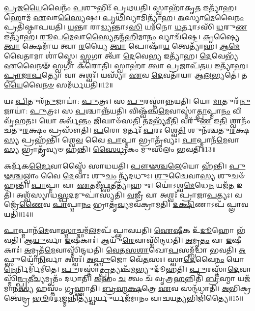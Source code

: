 \-\ul{𑌪𑍍𑌰}\-𑌜\-\ul{𑌯𑍈}\-𑌵𑍈𑌨𑌂᳴ \ul{𑌪}\-𑌶𑍁𑌭𑌿𑌃᳴ 𑌪𑍍𑌰𑌥𑌯𑌤𑌿।
𑌸𑍍𑌵𑌾𑌹𑌾᳴𑌕𑍃\-\ul{𑌤} 𑌇𑌤𑍍𑌯𑌾᳴𑌹।
𑌹𑍋𑌮᳴ \ul{𑌏}\-𑌵𑌾\-\ul{𑌸𑍍𑌯𑍈}\-𑌷𑌃।
\-\ul{𑌪𑍃}\-\-\ul{𑌥𑌿}\-𑌵𑍍𑌯𑌾𑌮𑌿𑌤𑍍𑌯𑌾᳴𑌹।
\-\ul{𑌅}\-𑌸𑍍𑌯𑌾\-\ul{𑌮𑍇}\-𑌵𑍈\-\ul{𑌨𑌂} 𑌪𑍍𑌰𑌤𑌿᳴\-𑌷𑍍𑌠𑌾𑌪𑌯𑌤𑌿।
\-\ul{𑌯}\-𑌨𑍍𑌤𑌾 𑌰𑌾\-\ul{𑌡𑍍𑌯}\-𑌨𑍍𑌤𑌾𑌽\-\ul{𑌸𑌿} 𑌯𑌮᳴𑌨𑍋 \ul{𑌧}\-𑌰𑍍𑌤𑌾𑌽𑌸𑌿᳴ \ul{𑌧}\-𑌰𑍁\-\ul{𑌣} 𑌇𑌤𑍍𑌯𑌾᳴𑌹।
\-\ul{𑌰𑍂}\-𑌪\-\ul{𑌮𑍇}\-𑌵𑌾\-\ul{𑌸𑍍𑌯𑍈}\-𑌤𑌨𑍍𑌮᳴\-\ul{𑌹𑌿}\-𑌮𑌾\-\ul{𑌨𑌂} 𑌵𑍍𑌯𑌾𑌚᳴𑌷𑍍𑌟𑍇।
\-\ul{𑌕𑍃}\-𑌷𑍍𑌯𑍈 \ul{𑌤𑍍𑌵𑌾} 𑌕𑍍𑌷𑍇𑌮𑌾᳴𑌯 𑌤𑍍𑌵𑌾 \ul{𑌰}\-𑌯𑍍𑌯𑍈 \ul{𑌤𑍍𑌵𑌾} 𑌪𑍋𑌷𑌾᳴\-\ul{𑌯} 𑌤𑍍𑌵𑍇𑌤𑍍𑌯𑌾᳴𑌹।
\-\ul{𑌆}\-\-\-\ul{𑌮𑍇}\-𑌵𑍈𑌤𑌾𑌮𑌾 𑌶𑌾॑𑌸𑍍𑌤𑍇।
\-\ul{𑌸𑍍𑌵}\-𑌗𑌾 𑌤𑍍𑌵𑌾᳴ \ul{𑌦𑍇}\-𑌵𑍇\-\ul{𑌭𑍍𑌯} 𑌇𑌤𑍍𑌯𑌾᳴𑌹।
\-\ul{𑌦𑍇}\-𑌵𑍇𑌭𑍍𑌯᳴ \ul{𑌏}\-𑌵𑍈𑌨𑍟᳴ \ul{𑌸𑍍𑌵}\-𑌗𑌾 𑌕᳴𑌰𑍋𑌤𑌿।
𑌸𑍍𑌵𑌾𑌹𑌾॑ 𑌤𑍍𑌵𑌾 \ul{𑌪𑍍𑌰}\-𑌜𑌾𑌪᳴𑌤\-\ul{𑌯} 𑌇𑌤𑍍𑌯𑌾᳴𑌹।
\-\ul{𑌪𑍍𑌰𑌾}\-\-\ul{𑌜𑌾}\-\-\ul{𑌪}\-𑌤𑍍𑌯𑍋 𑌵𑌾 𑌅𑌶𑍍𑌵𑌃᳴।
𑌯𑌸𑍍𑌯𑌾᳴ \ul{𑌏}\-𑌵 \ul{𑌦𑍇}\-𑌵𑌤𑌾᳴𑌯𑌾 𑌆\-\ul{𑌲}\-𑌭𑍍𑌯𑌤𑍇॑।
𑌤\-\ul{𑌯𑍈}\-𑌵𑍈\-\ul{𑌨}\-\-\ul{𑍞} 𑌸𑌮᳴𑌰𑍍𑌧𑌯𑌤𑌿॥12॥\anuvakamend[\-\ul{𑌬}\-\-\ul{𑌧𑍍𑌨𑌾}\-\-\ul{𑌤𑌿} 𑌸𑌮𑍃᳴𑌦𑍍𑌧𑍍𑌯𑌾 \ul{𑌉}\-𑌪𑌾𑌦᳴𑌧𑌾\-\ul{𑌤𑍍𑌯}\-𑌸𑍀𑌤𑍍𑌯𑌾᳴\-\ul{𑌹} 𑌸𑌪𑍍𑌰᳴𑌥\-\ul{𑌸}\-𑌮𑌿𑌤𑍍𑌯𑌾᳴𑌹 \ul{𑌦𑍇}\-𑌵𑍇\-\ul{𑌭𑍍𑌯} 𑌇𑌤𑍍𑌯𑌾᳴\-\ul{𑌹} 𑌪𑌞𑍍𑌚᳴ 𑌚]

𑌯𑌃 \ul{𑌪𑌿}\-𑌤𑍁𑌰᳴\-\ul{𑌨𑍁}\-𑌜𑌾𑌯𑌾॑: \ul{𑌪𑍁}\-𑌤𑍍𑌰𑌃।
𑌸 \ul{𑌪𑍁}\-𑌰𑌸𑍍𑌤𑌾॑𑌨𑍍𑌨𑌯𑌤𑌿।
𑌯𑍋 \ul{𑌮𑌾}\-𑌤𑍁𑌰᳴\-\ul{𑌨𑍁}\-𑌜𑌾𑌯𑌾॑: \ul{𑌪𑍁}\-𑌤𑍍𑌰𑌃।
𑌸 \ul{𑌪}\-𑌶𑍍𑌚𑌾𑌨𑍍𑌨᳴𑌯𑌤𑌿।
𑌵𑌿𑌷𑍍𑌵᳴𑌞𑍍𑌚\-\ul{𑌮𑍇}\-𑌵𑌾𑌸𑍍𑌮𑌾॑\-\ul{𑌤𑍍𑌪𑌾}\-𑌪𑍍𑌮𑌾\-\ul{𑌨𑌂} 𑌵𑌿𑌵𑍃᳴𑌹𑌤𑌃।
𑌯𑍋 𑌅𑌰𑍍𑌵᳴\-\ul{𑌨𑍍𑌤𑌂} 𑌜𑌿𑌘𑌾𑍞᳴𑌸\-\ul{𑌤𑌿} 𑌤\-\ul{𑌮}\-𑌭𑍍𑌯᳴𑌮𑍀\-\ul{𑌤𑌿} 𑌵𑌰𑍁᳴\-\ul{𑌣} 𑌇\-\ul{𑌤𑌿} 𑌶𑍍𑌵𑌾𑌨𑌂᳴ 𑌚𑌤𑍁\-\ul{𑌰}\-𑌕𑍍𑌷𑌂 𑌪𑍍𑌰𑌸𑍗᳴𑌤𑌿।
\-\ul{𑌪}\-𑌰𑍋 𑌮𑌰𑍍𑌤𑌃᳴ \ul{𑌪}\-𑌰𑌃 𑌶𑍍𑌵𑍇\-\ul{𑌤𑌿} 𑌶𑍁𑌨᳴𑌶𑍍𑌚𑌤𑍁\-\ul{𑌰}\-𑌕𑍍𑌷\-\ul{𑌸𑍍𑌯} 𑌪𑍍𑌰𑌹᳴𑌨𑍍𑌤𑌿।
𑌶𑍍𑌵𑍇\-\ul{𑌵} 𑌵𑍈 \ul{𑌪𑌾}\-𑌪𑍍𑌮𑌾 𑌭𑍍𑌰𑌾𑌤𑍃᳴𑌵𑍍𑌯𑌃।
\-\ul{𑌪𑌾}\-𑌪𑍍𑌮𑌾𑌨᳴\-\ul{𑌮𑍇}\-𑌵𑌾\-\ul{𑌸𑍍𑌯} 𑌭𑍍𑌰𑌾𑌤𑍃᳴𑌵𑍍𑌯𑍞 𑌹𑌨𑍍𑌤𑌿।
\-\ul{𑌸𑍈}\-\-\ul{𑌧𑍍𑌰}\-𑌕𑌂 𑌮𑍁𑌸᳴𑌲𑌂 𑌭𑌵𑌤𑌿॥13॥

𑌕𑌰𑍍𑌮᳴𑌕\-\ul{𑌰𑍍𑌮𑍈}\-𑌵𑌾𑌸𑍍𑌮𑍈᳴ 𑌸𑌾𑌧𑌯𑌤𑌿।
\-\ul{𑌪𑍗}\-\-\ul{𑍟}\-\-\ul{𑌶𑍍𑌚}\-\-\ul{𑌲𑍇}\-𑌯𑍋 𑌹᳴𑌨𑍍𑌤𑌿।
\-\ul{𑌪𑍁}\-\-\ul{𑍟}\-\-\ul{𑌶𑍍𑌚}\-𑌲𑍍𑌵𑌾𑌂 𑌵𑍈 \ul{𑌦𑍇}\-𑌵𑌾𑌃 𑌶𑍁\-\ul{𑌚𑌂} 𑌨𑍍𑌯᳴𑌦𑌧𑍁𑌃।
\-\ul{𑌶𑍁}\-𑌚𑍈𑌵𑌾\-\ul{𑌸𑍍𑌯} 𑌶𑍁𑌚𑍞᳴ 𑌹𑌨𑍍𑌤𑌿।
\-\ul{𑌪𑌾}\-𑌪𑍍𑌮𑌾 𑌵𑌾 \ul{𑌏}\-𑌤𑌮𑍀॑\-\ul{𑌫𑍍𑌸}\-𑌤𑍀𑌤𑍍𑌯𑌾᳴𑌹𑍁𑌃।
𑌯𑍋॑𑌽𑌶𑍍𑌵\-\ul{𑌮𑍇}\-𑌧𑍇\-\ul{𑌨} 𑌯𑌜᳴\-\ul{𑌤} 𑌇𑌤𑌿᳴।
𑌅𑌶𑍍𑌵᳴𑌸𑍍𑌯𑌾𑌧\-\ul{𑌸𑍍𑌪}\-𑌦𑌮𑍁\-𑌪𑌾॑𑌸𑍍𑌯𑌤𑌿।
\-\ul{𑌵}\-𑌜𑍍𑌰𑍀 𑌵𑌾 𑌅𑌶𑍍𑌵𑌃᳴ 𑌪𑍍𑌰𑌾𑌜𑌾\-\ul{𑌪}\-𑌤𑍍𑌯𑌃।
𑌵𑌜𑍍𑌰𑍇᳴\-\ul{𑌣𑍈}\-𑌵 \ul{𑌪𑌾}\-𑌪𑍍𑌮𑌾\-\ul{𑌨𑌂} 𑌭𑍍𑌰𑌾𑌤𑍃᳴\-\ul{𑌵𑍍𑌯}\-𑌮𑌵᳴\-𑌕𑍍𑌰𑌾𑌮𑌤𑌿।
\-\ul{𑌦}\-\-\ul{𑌕𑍍𑌷𑌿}\-𑌣𑌾𑌽𑌪᳴ 𑌪𑍍𑌲𑌾𑌵𑌯𑌤𑌿॥14॥

\-\ul{𑌪𑌾}\-𑌪𑍍𑌮𑌾𑌨᳴\-\ul{𑌮𑍇}\-𑌵𑌾\-\ul{𑌸𑍍𑌮𑌾}\-𑌚𑍍𑌛𑌮᳴\-\ul{𑌲}\-𑌮𑌪᳴ 𑌪𑍍𑌲𑌾𑌵𑌯𑌤𑌿।
\-\ul{𑌐}\-\-\ul{𑌷𑍀}\-𑌕 𑌉᳴\-\ul{𑌦𑍂}\-𑌹𑍋 𑌭᳴𑌵𑌤𑌿।
𑌆\-\ul{𑌯𑍁}\-𑌰𑍍𑌵𑌾 \ul{𑌇}\-𑌷𑍀𑌕𑌾𑌃॑।
𑌆𑌯𑍁᳴\-\ul{𑌰𑍇}\-𑌵𑌾𑌸𑍍𑌮𑌿᳴𑌨𑍍𑌦𑌧𑌤𑌿।
\-\ul{𑌅}\-𑌮𑍃\-\ul{𑌤𑌂} 𑌵𑌾 \ul{𑌇}\-𑌷𑍀𑌕𑌾𑌃॑।
\-\ul{𑌅}\-𑌮𑍃𑌤᳴\-\ul{𑌮𑍇}\-𑌵𑌾𑌸𑍍𑌮𑌿᳴𑌨𑍍𑌦𑌧𑌤𑌿।
\-\ul{𑌵𑍇}\-\-\ul{𑌤}\-\-\ul{𑌸}\-\-\ul{𑌶𑌾}\-𑌖𑍋\-\ul{𑌪}\-𑌸𑌮𑍍𑌬᳴𑌦𑍍𑌧𑌾 𑌭𑌵𑌤𑌿।
\-\ul{𑌅}\-𑌫𑍍𑌸𑍁𑌯𑍋᳴\-\ul{𑌨𑌿}\-𑌰𑍍𑌵𑌾 𑌅𑌶𑍍𑌵𑌃᳴।
\-\ul{𑌅}\-\-\ul{𑌫𑍍𑌸𑍁}\-𑌜𑍋 𑌵𑍇᳴\-\ul{𑌤}\-𑌸𑌃।
𑌸𑍍𑌵𑌾\-\ul{𑌦𑍇}\-𑌵𑍈\-\ul{𑌨𑌂} 𑌯𑍋\-\ul{𑌨𑍇}\-𑌰𑍍𑌨𑌿𑌰𑍍𑌮𑌿᳴𑌮𑍀𑌤𑍇।
\-\ul{𑌪𑍁}\-𑌰𑌸𑍍𑌤𑌾॑\-\ul{𑌤𑍍𑌪𑍍𑌰}\-𑌤𑍍𑌯𑌞𑍍𑌚᳴\-\ul{𑌮}\-𑌭𑍍𑌯𑍁𑌦𑍂᳴𑌹𑌤𑌿।
\-\ul{𑌪𑍁}\-𑌰𑌸𑍍𑌤𑌾᳴\-\ul{𑌦𑍇}\-𑌵𑌾𑌸𑍍𑌮𑌿᳴\-\ul{𑌨𑍍𑌪𑍍𑌰}\-𑌤𑍀\-\ul{𑌚𑍍𑌯}\-𑌮𑍃𑌤𑌂᳴ 𑌦𑌧𑌾𑌤𑌿।
\-\ul{𑌅}\-𑌹𑌂 \ul{𑌚} 𑌤𑍍𑌵𑌂 𑌚᳴ 𑌵𑍃𑌤𑍍𑌰\-\ul{𑌹}\-𑌨𑍍𑌨𑌿𑌤𑌿᳴ \ul{𑌬𑍍𑌰}\-𑌹𑍍𑌮𑌾 𑌯𑌜᳴𑌮𑌾𑌨\-\ul{𑌸𑍍𑌯} 𑌹𑌸𑍍𑌤𑌂᳴ 𑌗𑍃𑌹𑍍𑌣𑌾𑌤𑌿।
\-\ul{𑌬𑍍𑌰}\-\-\ul{𑌹𑍍𑌮}\-\-\ul{𑌕𑍍𑌷}\-𑌤𑍍𑌰𑍇 \ul{𑌏}\-𑌵 𑌸𑌨𑍍𑌦᳴𑌧𑌾𑌤𑌿।
\-\ul{𑌅}\-𑌭𑌿𑌕𑍍𑌰𑌤𑍍𑌵𑍇॑𑌨𑍍𑌦𑍍𑌰 \ul{𑌭𑍂}\-𑌰\-\ul{𑌧}\-𑌜𑍍𑌮𑌨𑍍𑌨𑌿𑌤𑍍𑌯᳴\-\ul{𑌧𑍍𑌵}\-𑌰𑍍𑌯𑍁𑌰𑍍𑌯𑌜᳴𑌮𑌾𑌨𑌂 𑌵𑌾𑌚𑌯\-\ul{𑌤𑍍𑌯}\-𑌭𑌿𑌜𑌿᳴𑌤𑍍𑌯𑍈॥15॥\anuvakamend[\-\ul{𑌭}\-\-\ul{𑌵}\-\-\ul{𑌤𑌿} \ul{𑌪𑍍𑌲𑌾}\-\-\ul{𑌵}\-\-\ul{𑌯}\-\-\ul{𑌤𑌿} \ul{𑌮𑌿}\-\-\ul{𑌮𑍀}\-\-\ul{𑌤𑍇} 𑌪𑌞𑍍𑌚᳴ 𑌚]

